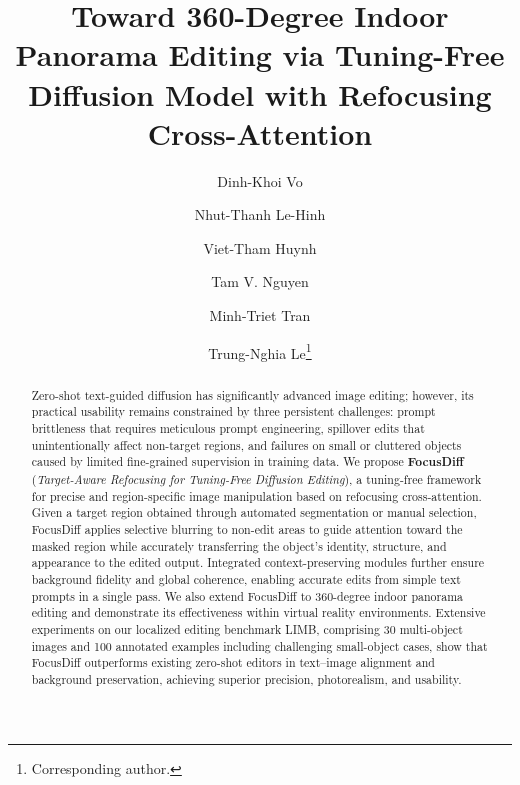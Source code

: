 \documentclass[runningheads]{llncs}
\begin{document}
\title{Toward 360-Degree Indoor Panorama Editing via Tuning-Free Diffusion Model with Refocusing Cross-Attention}


\author{
Dinh-Khoi Vo \and
Nhut-Thanh Le-Hinh \and
Viet-Tham Huynh \and
Tam V. Nguyen \and
Minh-Triet Tran \and
Trung-Nghia Le\thanks{Corresponding author.}}



\maketitle

\begin{abstract}
Zero-shot text-guided diffusion has significantly advanced image editing; however, its practical usability remains constrained by three persistent challenges: prompt brittleness that requires meticulous prompt engineering, spillover edits that unintentionally affect non-target regions, and failures on small or cluttered objects caused by limited fine-grained supervision in training data. We propose \textbf{FocusDiff} (\emph{Target-Aware Refocusing for Tuning-Free Diffusion Editing}), a tuning-free framework for precise and region-specific image manipulation based on refocusing cross-attention. Given a target region obtained through automated segmentation or manual selection, FocusDiff applies selective blurring to non-edit areas to guide attention toward the masked region while accurately transferring the object's identity, structure, and appearance to the edited output. Integrated context-preserving modules further ensure background fidelity and global coherence, enabling accurate edits from simple text prompts in a single pass. We also extend FocusDiff to 360-degree indoor panorama editing and demonstrate its effectiveness within virtual reality environments. Extensive experiments on our localized editing benchmark LIMB, comprising 30 multi-object images and 100 annotated examples including challenging small-object cases, show that FocusDiff outperforms existing zero-shot editors in text–image alignment and background preservation, achieving superior precision, photorealism, and usability.


\end{abstract}
\end{document}
